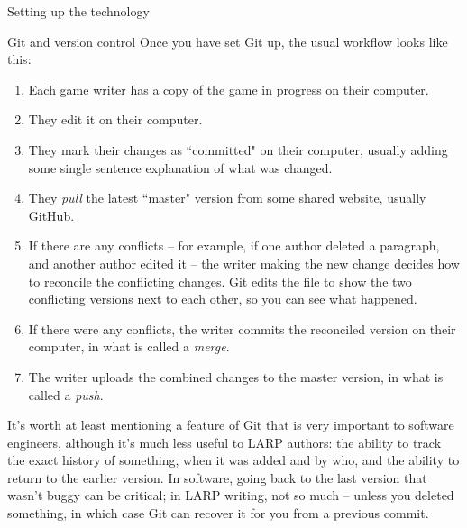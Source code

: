 \documentclass{article}
\begin{document}
\begin{section}{Setting up the technology}
\begin{subsection}{Git and version control}
Once you have set Git up, the usual workflow looks like this:
\begin{enumerate}
\item Each game writer has a copy of the game in progress on their computer.
\item They edit it on their computer.
\item They mark their changes as ``committed" on their computer, usually adding some single sentence explanation of what was changed.
\item They \textit{pull} the latest ``master" version from some shared website, usually GitHub.  
\item If there are any conflicts – for example, if one author deleted a paragraph, and another author edited it – the writer making the new change decides how to reconcile the conflicting changes.  Git edits the file to show the two conflicting versions next to each other, so you can see what happened.
\item If there were any conflicts, the writer commits the reconciled version on their computer, in what is called a \textit{merge}.
\item The writer uploads the combined changes to the master version, in what is called a \textit{push}.
\end{enumerate}

It's worth at least mentioning a feature of Git that is very important to software engineers, although it's much less useful to LARP authors: the ability to track the exact history of something, when it was added and by who, and the ability to return to the earlier version.  In software, going back to the last version that wasn't buggy can be critical; in LARP writing, not so much – unless you deleted something, in which case Git can recover it for you from a previous commit.

\end{subsection}
\end{section}
\end{document}
